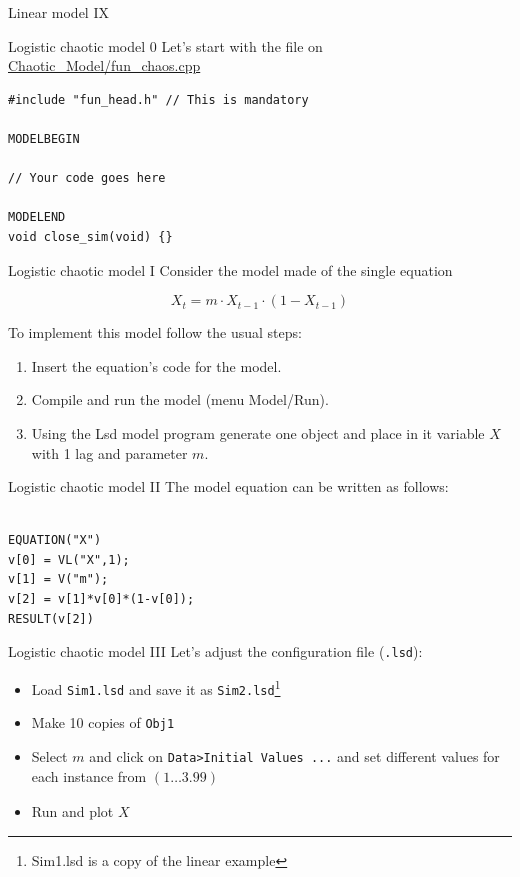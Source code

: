 \documentclass[bigger,aspectratio=169]{beamer}
\begin{document}
\begin{frame}[label={sec:orgbf589c7}]{Linear model IX}
\begin{center}

\end{center}
\end{frame}
\begin{frame}[label={sec:org528f3c3},fragile]{Logistic chaotic model 0}
 Let's start with the file on \url{Chaotic\_Model/fun\_chaos.cpp}


\begin{verbatim}
#include "fun_head.h" // This is mandatory

MODELBEGIN

// Your code goes here

MODELEND
void close_sim(void) {}
\end{verbatim}
\end{frame}
\begin{frame}[label={sec:org9326e4a}]{Logistic chaotic model I}
Consider the model made of the single equation

\[X_{t} = m\cdot X_{t-1}\cdot (1 - X_{t-1})\]

To implement this model follow the usual steps:
\begin{enumerate}
\item Insert the equation’s code for the model.
\item Compile and run the model (menu \alert{Model/Run}).
\item Using the Lsd model program generate one object and place in it variable \(X\) with 1 lag and parameter \(m\).
\end{enumerate}
\end{frame}
\begin{frame}[label={sec:org1e406a4},fragile]{Logistic chaotic model II}
 The model equation can be written as follows:


\begin{verbatim}

EQUATION("X")
v[0] = VL("X",1);
v[1] = V("m");
v[2] = v[1]*v[0]*(1-v[0]);
RESULT(v[2])
\end{verbatim}
\end{frame}
\begin{frame}[label={sec:org0d60bee},fragile]{Logistic chaotic model III}
 Let's adjust the configuration file (\texttt{.lsd}):

\begin{itemize}
\item Load \texttt{Sim1.lsd} and save it as \texttt{Sim2.lsd}\footnote{Sim1.lsd is a copy of the linear example}
\item Make \alert{10} copies of \texttt{Obj1}
\item Select \(m\) and click on \texttt{Data>Initial Values ...} and set different values for each instance from \((1 \ldots 3.99)_{}\)
\item Run and plot \(X\)
\end{itemize}
\end{frame}
\end{document}
